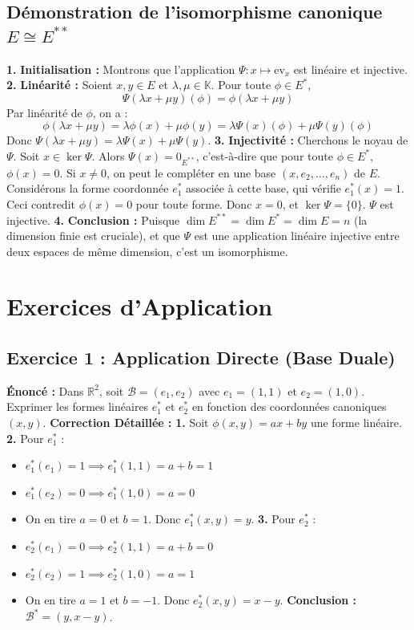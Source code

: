 \documentclass[12pt,a4paper]{report}
\begin{document}
\subsection*{Démonstration de l'isomorphisme canonique $E \cong E^{**}$}
\textbf{1.} \textbf{Initialisation :} Montrons que l'application $\Psi : x \mapsto \text{ev}_x$ est linéaire et injective.
\textbf{2.} \textbf{Linéarité :} Soient $x, y \in E$ et $\lambda, \mu \in \mathbb{K}$. Pour toute $\phi \in E^*$,
   $$\Psi(\lambda x + \mu y)(\phi) = \phi(\lambda x + \mu y)$$
   Par linéarité de $\phi$, on a :
   $$\phi(\lambda x + \mu y) = \lambda \phi(x) + \mu \phi(y) = \lambda \Psi(x)(\phi) + \mu \Psi(y)(\phi)$$
   Donc $\Psi(\lambda x + \mu y) = \lambda \Psi(x) + \mu \Psi(y)$.
\textbf{3.} \textbf{Injectivité :} Cherchons le noyau de $\Psi$. Soit $x \in \ker \Psi$. Alors $\Psi(x) = 0_{E^{**}}$, c'est-à-dire que pour toute $\phi \in E^*$, $\phi(x) = 0$.
   Si $x \neq 0$, on peut le compléter en une base $(x, e_2, \dots, e_n)$ de $E$. Considérons la forme coordonnée $e_1^*$ associée à cette base, qui vérifie $e_1^*(x) = 1$. Ceci contredit $\phi(x) = 0$ pour toute forme. Donc $x = 0$, et $\ker \Psi = \{0\}$. $\Psi$ est injective.
\textbf{4.} \textbf{Conclusion :} Puisque $\dim E^{**} = \dim E^* = \dim E = n$ (la dimension finie est cruciale), et que $\Psi$ est une application linéaire injective entre deux espaces de même dimension, c'est un isomorphisme.


\section{Exercices d'Application}
\subsection*{Exercice 1 : Application Directe (Base Duale)}
\textbf{Énoncé :} Dans $\mathbb{R}^2$, soit $\mathcal{B} = (e_1, e_2)$ avec $e_1 = (1, 1)$ et $e_2 = (1, 0)$. Exprimer les formes linéaires $e^*_1$ et $e^*_2$ en fonction des coordonnées canoniques $(x, y)$.
\textbf{Correction Détaillée :}
\textbf{1.} Soit $\phi(x, y) = ax + by$ une forme linéaire.
\textbf{2.} Pour $e^*_1$ :
\begin{itemize}
\item $e^*_1(e_1) = 1 \implies e^*_1(1, 1) = a+b = 1$
\item $e^*_1(e_2) = 0 \implies e^*_1(1, 0) = a = 0$
\item On en tire $a=0$ et $b=1$. Donc $e^*_1(x, y) = y$.
\textbf{3.} Pour $e^*_2$ :
\item $e^*_2(e_1) = 0 \implies e^*_2(1, 1) = a+b = 0$
\item $e^*_2(e_2) = 1 \implies e^*_2(1, 0) = a = 1$
\item On en tire $a=1$ et $b=-1$. Donc $e^*_2(x, y) = x - y$.
\textbf{Conclusion :} $\mathcal{B}^* = (y, x-y)$.
\end{itemize}
\end{document}
